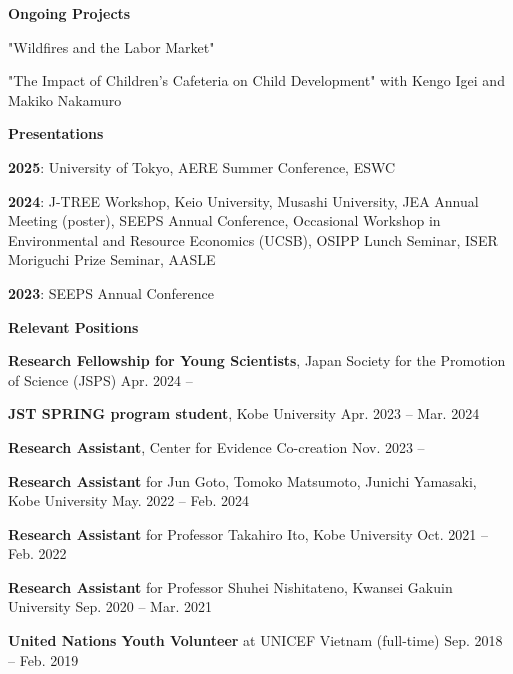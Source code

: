 \documentclass{article}
\begin{document}
\begin{flushleft}
  \textbf{\large{Ongoing Projects}}
\end{flushleft}

"Wildfires and the Labor Market"

"The Impact of Children's Cafeteria on Child Development" with Kengo Igei and Makiko Nakamuro

\hrulefill

\begin{flushleft}
  \textbf{\large{Presentations}}
\end{flushleft}

\textbf{2025}: University of Tokyo, AERE Summer Conference, ESWC

\textbf{2024}: J-TREE Workshop, Keio University, Musashi University, JEA Annual Meeting (poster), SEEPS Annual Conference, Occasional Workshop in Environmental and Resource Economics (UCSB), OSIPP Lunch Seminar, ISER Moriguchi Prize Seminar, AASLE

\textbf{2023}: SEEPS Annual Conference

\hrulefill

\begin{flushleft}
  \textbf{\large{Relevant Positions}}
\end{flushleft}

\textbf{Research Fellowship for Young Scientists}, Japan Society for the Promotion of Science (JSPS) \hspace{\fill} Apr. 2024 --

\textbf{JST SPRING program student}, Kobe University \hspace{\fill} Apr. 2023 -- Mar. 2024

\textbf{Research Assistant}, Center for Evidence Co-creation \hspace{\fill} Nov. 2023 --

\textbf{Research Assistant} for Jun Goto, Tomoko Matsumoto, Junichi Yamasaki, Kobe University \hspace{\fill} May. 2022 -- Feb. 2024

\textbf{Research Assistant} for Professor Takahiro Ito, Kobe University \hspace{\fill} Oct. 2021 -- Feb. 2022

\textbf{Research Assistant} for Professor Shuhei Nishitateno, Kwansei Gakuin University \hspace{\fill} Sep. 2020 -- Mar. 2021

\textbf{United Nations Youth Volunteer} at UNICEF Vietnam (full-time) \hspace{\fill} Sep. 2018 -- Feb. 2019
\end{document}
